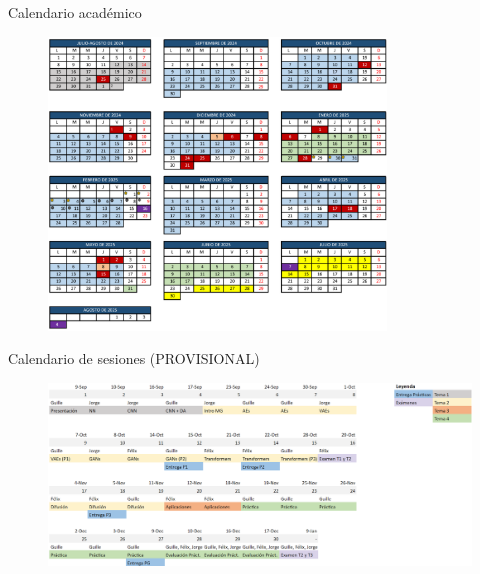 \begin{frame}{Calendario académico}
\begin{figure}
    \centering
    \includegraphics[width=0.8\textwidth]{figures/Presentacion/Calendario_Academico.png}
\end{figure}
\end{frame}

\begin{frame}{Calendario de sesiones (PROVISIONAL)}
\begin{figure}
    \centering
    \includegraphics[width=\textwidth]{figures/Presentacion/Sesiones.png}
\end{figure}
\end{frame}

